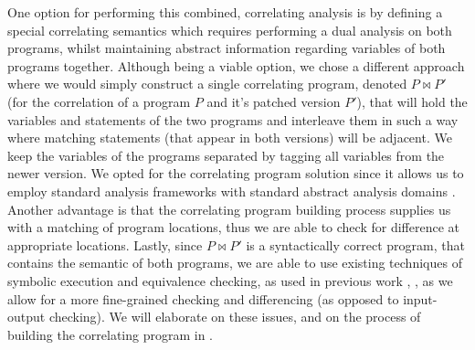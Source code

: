 One option for performing this combined, correlating analysis is by defining a special correlating semantics which requires performing a dual analysis on both programs, whilst maintaining abstract information regarding variables of both programs together. Although being a viable option, we chose a different approach where we would simply construct a single correlating program, denoted $P \bowtie P'$ (for the correlation of a program $P$ and it's patched version $P'$), that will hold the variables and statements of the two programs and interleave them in such a way where matching statements (that appear in both versions) will be adjacent. We keep the variables of the programs separated by tagging all variables from the newer version. We opted for the correlating program solution since it allows us to employ standard analysis frameworks \cite{CLang} with standard abstract analysis domains \cite{JeannetMine09}. Another advantage is that the correlating program building process supplies us with a matching of program locations, thus we are able to check for difference at appropriate locations. Lastly, since $P \bowtie P'$ is a syntactically correct program, that contains the semantic of both programs, we are able to use existing techniques of symbolic execution and equivalence checking, as used in previous work \cite{GodlinStrichman09,DwyerElbaumPerson08,EnglerRamos11}, , as we allow for a more fine-grained checking and differencing (as opposed to input-output checking). We will elaborate on these issues, and on the process of building the correlating program in .






